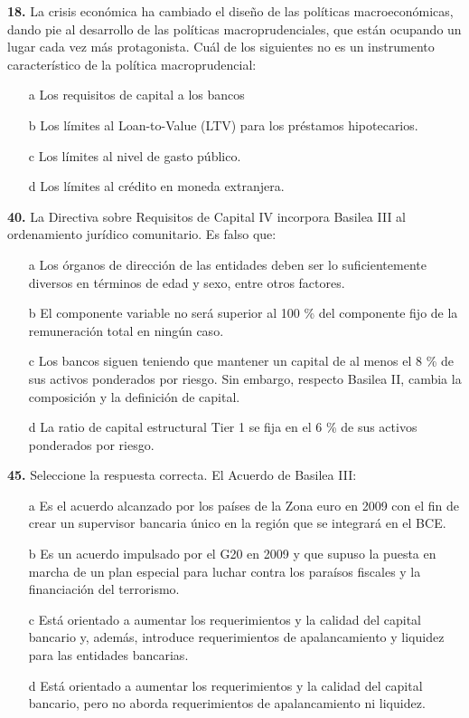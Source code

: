 \documentclass{nuevotema}
\begin{document}
\textbf{18.} La crisis económica ha cambiado el diseño de las políticas macroeconómicas, dando pie al desarrollo de las políticas macroprudenciales, que están ocupando un lugar cada vez más protagonista. Cuál de los siguientes no es un instrumento característico de la política macroprudencial:

\begin{itemize}
	\item[a] Los requisitos de capital a los bancos
	\item[b] Los límites al Loan-to-Value (LTV) para los préstamos hipotecarios.
	\item[c] Los límites al nivel de gasto público.
	\item[d] Los límites al crédito en moneda extranjera.
\end{itemize}

\textbf{40.} La Directiva sobre Requisitos de Capital IV incorpora Basilea III al ordenamiento jurídico comunitario. Es falso que:

\begin{itemize}
	\item[a] Los órganos de dirección de las entidades deben ser lo suficientemente diversos en términos de edad y sexo, entre otros factores.
	\item[b] El componente variable no será superior al 100 \% del componente fijo de la remuneración total en ningún caso. 
	\item[c] Los bancos siguen teniendo que mantener un capital de al menos el 8 \% de sus activos ponderados por riesgo. Sin embargo, respecto Basilea II, cambia la composición y la definición de capital.
	\item[d] La ratio de capital estructural Tier 1 se fija en el 6 \% de sus activos ponderados por riesgo.
\end{itemize}


\textbf{45.} Seleccione la respuesta correcta. El Acuerdo de Basilea III:

\begin{itemize}
	\item[a] Es el acuerdo alcanzado por los países de la Zona euro en 2009 con el fin de crear un supervisor bancaria único en la región que se integrará en el BCE.
	\item[b] Es un acuerdo impulsado por el G20 en 2009 y que supuso la puesta en marcha de un plan especial para luchar contra los paraísos fiscales y la financiación del terrorismo.
	\item[c] Está orientado a aumentar los requerimientos y la calidad del capital bancario y, además, introduce requerimientos de apalancamiento y liquidez para las entidades bancarias.
	\item[d] Está orientado a aumentar los requerimientos y la calidad del capital bancario, pero no aborda requerimientos de apalancamiento ni liquidez.
\end{itemize}
\end{document}
